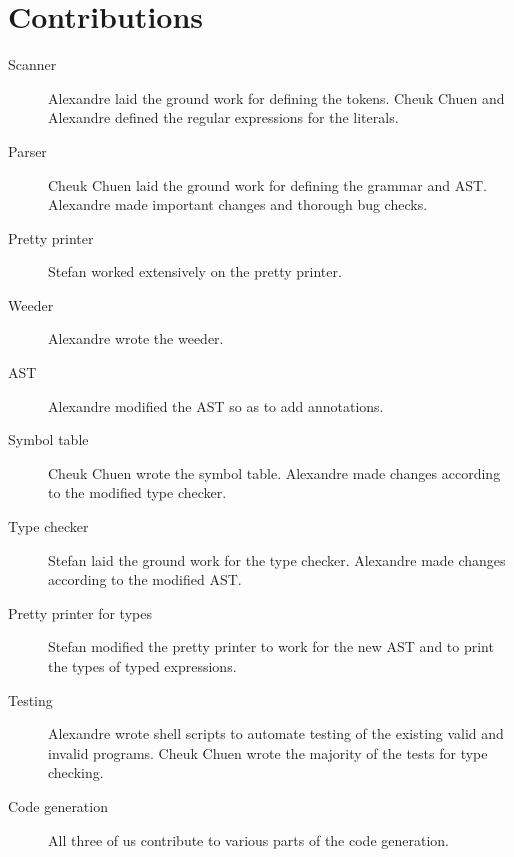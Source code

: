 \documentclass{article}
\begin{document}
\section{Contributions}
\begin{description}
  \item [Scanner] Alexandre laid the ground work for defining the tokens. Cheuk Chuen and Alexandre defined the regular expressions for the literals.
  \item [Parser] Cheuk Chuen laid the ground work for defining the grammar and AST. Alexandre made important changes and thorough bug checks.
  \item [Pretty printer] Stefan worked extensively on the pretty printer.
  \item [Weeder] Alexandre wrote the weeder.
  \item [AST] Alexandre modified the AST so as to add annotations.
  \item [Symbol table] Cheuk Chuen wrote the symbol table. Alexandre made changes according to the modified type checker.
  \item [Type checker] Stefan laid the ground work for the type checker. Alexandre made changes according to the modified AST.
  \item [Pretty printer for types] Stefan modified the pretty printer to work for the new AST and to print the types of typed expressions.
  \item [Testing] Alexandre wrote shell scripts to automate testing of the existing valid and invalid programs. Cheuk Chuen wrote the majority of the tests for type checking.
  \item [Code generation] All three of us contribute to various parts of the code generation.
\end{description}
\end{document}
